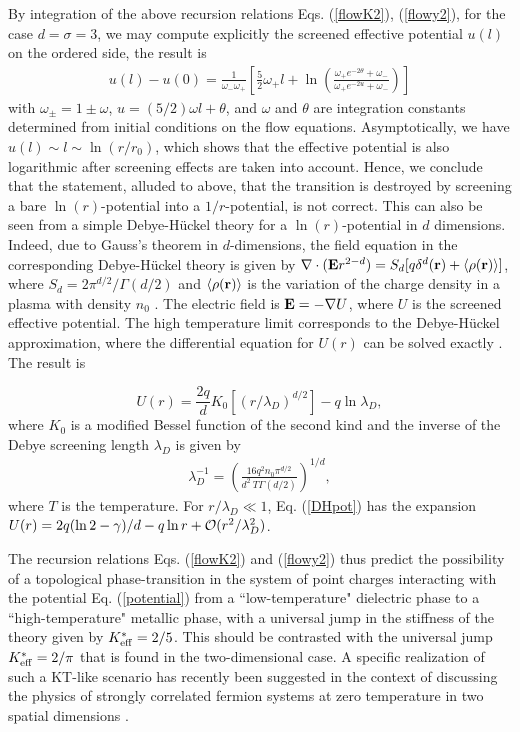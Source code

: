 \documentclass[a4paper,showpacs,preprintnumbers,amsmath,amssymb,prl,twocolumn]{revtex4}
\begin{document}
By integration of the above recursion relations Eqs. (\ref{flowK2}), (\ref{flowy2}), 
for the case $d=\sigma=3$, we may compute explicitly the screened effective potential 
$u(l)$ on the  ordered side, the result is \cite{Note}
\begin{eqnarray}
u(l)-u(0) =   
\frac{1}{\omega_- \omega_+} \left[
\frac{5}{2} \omega_+ l + \ln \left(
\frac{\omega_+ e^{-2 \theta} + \omega_-}{\omega_+ e^{-2 u } + \omega_-} \right) \right]
\end{eqnarray}
with $\omega_{\pm} = 1 \pm \omega$, $u = (5/2) \omega l + \theta$, and $\omega$ and $\theta$ 
are integration constants determined from initial conditions on the flow equations. 
Asymptotically, we have $u(l) \sim l \sim \ln(r/r_0)$, which shows that the effective
potential is also logarithmic after screening effects are taken into account. Hence, 
we conclude that the statement, alluded to above, that the transition is destroyed 
by screening a bare $\ln(r)$-potential into a $1/r$-potential, 
is not correct. This can also be seen from a simple Debye-H\"uckel 
theory for a $\ln(r)$-potential in $d$ dimensions. Indeed, due to 
Gauss's theorem 
in $d$-dimensions, the field equation in the corresponding 
Debye-H\"uckel theory is given by \cite{Dixit} 
$\nabla\cdot({\bf E} r^{2-d})=S_d[q\delta^d({\bf r})+
\langle\rho({\bf r})\rangle]$, where $S_d=2\pi^{d/2}/\Gamma(d/2)$ 
and $\langle\rho({\bf r})\rangle$ is the variation of the charge 
density in a plasma with density $n_0$ \cite{Ichimaru}. 
The electric field is 
${\bf E}=-\nabla U$, where $U$ is the screened effective potential. 
The high temperature limit corresponds to the Debye-H\"uckel 
approximation, where the differential equation for $U(r)$ 
can be solved exactly \cite{Dixit}. The result is 

\begin{equation}
\label{DHpot}
U(r)=\frac{2q}{d}K_0[(r/\lambda_D)^{d/2}]-q\ln\lambda_D,
\end{equation}
where $K_0$ is a modified Bessel function of the second kind and
 the inverse of the Debye screening length  $\lambda_D$ is given by
\begin{eqnarray}
\lambda_D^{-1}=\left(\frac{16q^2n_0\pi^{d/2}}{d^2 ~T \Gamma(d/2)} \right)^{1/d},
\end{eqnarray} 
where $T$ is the temperature. For $r/\lambda_D\ll 1$, 
Eq. (\ref{DHpot}) has the expansion 
$U(r)=2q(\ln 2-\gamma)/d-q\ln r+{\cal O}(r^2/\lambda_D^2)$.    

The recursion relations Eqs. (\ref{flowK2}) and (\ref{flowy2}) thus predict the 
possibility of a topological phase-transition in the system of point charges 
interacting with the potential Eq. (\ref{potential}) from a ``low-temperature" 
dielectric phase to a ``high-temperature" metallic phase, with a universal jump in the stiffness 
of the theory given by  $K^*_{\rm{eff}} = 2/5$. This should be contrasted with
the universal jump $K^*_{\rm{eff}}=2/\pi$ that is found in the two-dimensional
case. A specific realization of 
such a KT-like scenario has recently been suggested in the context of 
discussing the physics of strongly correlated fermion systems at zero
temperature in two spatial dimensions \cite{KNS}.
\end{document}
